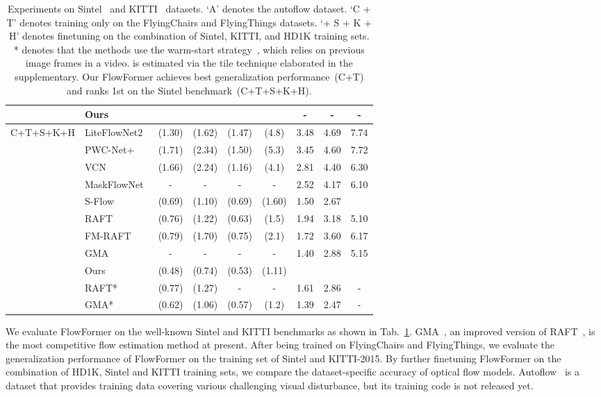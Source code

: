 \begin{table}[t]
{\begin{tabular}{clccccccc}
& Ours   &  &  &  &  & - & - & - \\
\hline
\multirow{11}{*}{C+T+S+K+H}                         &    LiteFlowNet2~\cite{hui2020lightweight}    &    (1.30)                       &       (1.62)                    &   (1.47)                          &      (4.8)                      &       3.48                     &         4.69                   &          7.74   \\
 &  PWC-Net+~\cite{sun2019models} & (1.71) & (2.34) &  (1.50) &  (5.3) & 3.45 &  4.60 & 7.72\\
 & VCN~\cite{yang2019volumetric} & (1.66) & (2.24) & (1.16) & (4.1) & 2.81 & 4.40 & 6.30 \\
 &  MaskFlowNet~\cite{zhao2020maskflownet} & - & - & - & - & 2.52 & 4.17 & 6.10 \\
  &  S-Flow~\cite{zhang2021separable} & (0.69) & (1.10) & (0.69) & (1.60) & 1.50 & 2.67 &  \\
 &  RAFT~\cite{teed2020raft} & (0.76) & (1.22) & (0.63) & (1.5) & 1.94 & 3.18 & 5.10
\\
 &  FM-RAFT~\cite{jiang2021learning2} & (0.79) & (1.70) & (0.75) & (2.1) & 1.72 & 3.60 &  6.17 \\
 &  GMA~\cite{jiang2021learning} & - & - & - & - & 1.40 & 2.88 & 5.15 \\
&  Ours & (0.48) & (0.74) & (0.53) & (1.11) &  &  &   \\
\cmidrule(r{1.0ex}){2-9}
&  RAFT*~\cite{teed2020raft} & (0.77) & (1.27) & - & - & 1.61 & 2.86 & -
\\
 &  GMA*~\cite{jiang2021learning} & (0.62) & (1.06) & (0.57) & (1.2) & 1.39 & 2.47 & - \\
\hline
\end{tabular}
}
\caption{\label{Tab: comparison} Experiments on Sintel~\cite{butler2012naturalistic} and KITTI~\cite{geiger2013vision} datasets. `A' denotes the autoflow dataset. `C + T' denotes training only on the FlyingChairs and FlyingThings datasets. `+ S + K + H' denotes finetuning on the combination of Sintel, KITTI, and HD1K training sets.  * denotes that the methods use the warm-start strategy~\cite{teed2020raft}, which relies on previous image frames in a video.  is estimated via the tile technique elaborated in the supplementary.
Our FlowFormer achieves best generalization performance~(C+T) and ranks 1st on the Sintel benchmark~(C+T+S+K+H).
}
\end{table}


We evaluate FlowFormer on the well-known Sintel and KITTI benchmarks as shown in Tab.~\ref{Tab: comparison}.
GMA~\cite{jiang2021learning}, an improved version of RAFT~\cite{teed2020raft}, is the most competitive flow estimation method at present.
After being trained on FlyingChairs and FlyingThings, we evaluate the generalization performance of FlowFormer on the training set of Sintel and KITTI-2015.
By further finetuning FlowFormer on the combination of HD1K, Sintel and KITTI training sets,
we compare the dataset-specific accuracy of optical flow models.
Autoflow~\cite{sun2021autoflow} is a dataset that provides training data covering various challenging visual disturbance, but its training code is not released yet.


